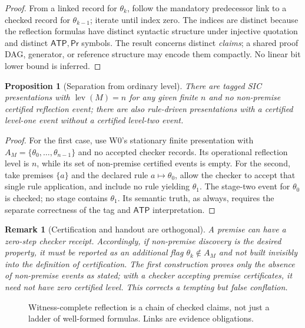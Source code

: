 \documentclass[11pt,letterpaper]{article}
\newtheorem{proposition}[theorem]{Proposition}
\newtheorem{remark}[theorem]{Remark}
\newcommand{\Prv}{\mathsf{Pr}}
\newcommand{\ATP}{\mathsf{ATP}}
\newcommand{\lev}{\operatorname{lev}}
\begin{document}
\begin{proof}
From a linked record for $\theta_k$, follow the mandatory predecessor link to a checked record for $\theta_{k-1}$; iterate until index zero. The indices are distinct because the reflection formulas have distinct syntactic structure under injective quotation and distinct $\ATP,\Prv$ symbols. The result concerns distinct \emph{claims}; a shared proof DAG, generator, or reference structure may encode them compactly. No linear bit lower bound is inferred.
\end{proof}
\begin{proposition}[Separation from ordinary level]\label{prop:separation}
There are tagged SIC presentations with $\lev(M)=n$ for any given finite $n$ and no non-premise certified reflection event; there are also rule-driven presentations with a certified level-one event without a certified level-two event.
\end{proposition}
\begin{proof}
For the first case, use W0's stationary finite presentation with $A_M=\{\theta_0,\ldots,\theta_{n-1}\}$ and no accepted checker records. Its operational reflection level is $n$, while its set of non-premise certified events is empty. For the second, take premises $\{a\}$ and the declared rule $a\mapsto\theta_0$, allow the checker to accept that single rule application, and include no rule yielding $\theta_1$. The stage-two event for $\theta_0$ is checked; no stage contains $\theta_1$. Its semantic truth, as always, requires the separate correctness of the tag and $\ATP$ interpretation.
\end{proof}
\begin{remark}[Certification and handout are orthogonal]
A premise can have a zero-step checker receipt. Accordingly, if \emph{non-premise discovery} is the desired property, it must be reported as an additional flag $\theta_k\notin A_M$ and not built invisibly into the definition of certification. The first construction proves only the absence of non-premise events as stated; with a checker accepting premise certificates, it need not have zero certified level. This corrects a tempting but false conflation.
\end{remark}

\begin{figure}[htbp]\centering
{}
\caption{Witness-complete reflection is a chain of checked claims, not just a ladder of well-formed formulas. Links are evidence obligations.}\label{fig:links}
\end{figure}
\end{document}

